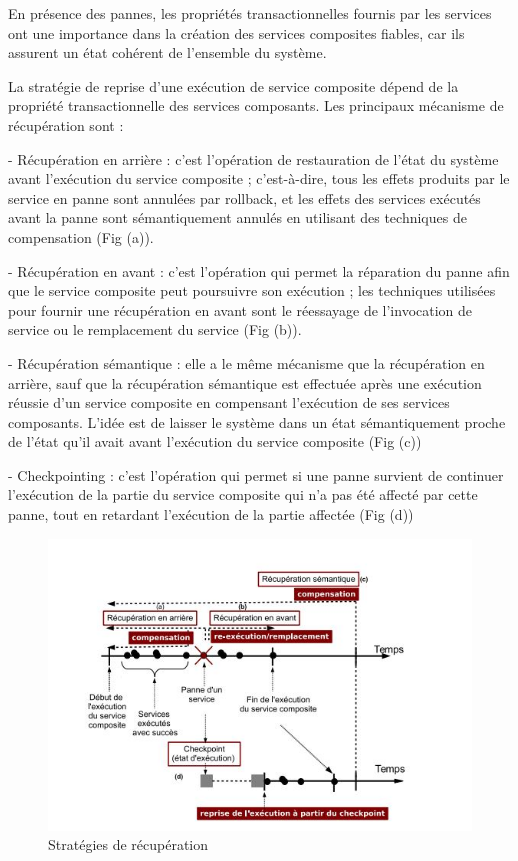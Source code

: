 En présence des pannes, les propriétés transactionnelles fournis par les services ont une importance dans la création des services composites fiables, car ils assurent un état cohérent de l'ensemble du système.

La stratégie de reprise d'une exécution de service composite dépend de la propriété transactionnelle des services composants.
Les principaux mécanisme de récupération sont \cite{1} : 

- Récupération en arrière : c'est l'opération de restauration de l’état du système avant l’exécution du service composite ; c’est-à-dire, tous les effets produits par le service en panne sont annulées par rollback, et les effets des services exécutés avant la panne sont sémantiquement annulés en utilisant des techniques de compensation (Fig (a)).


- Récupération en avant : c'est l'opération qui permet la réparation du panne afin que le  service composite peut poursuivre son exécution ; les techniques utilisées pour fournir une récupération en avant sont le réessayage de l’invocation de service ou le remplacement du service (Fig (b)).


- Récupération sémantique : elle a le même mécanisme que la récupération en arrière, sauf que la récupération sémantique est effectuée après une exécution réussie d’un service composite en compensant l’exécution de ses services composants. L’idée est de laisser le système dans un état sémantiquement proche de l’état qu’il avait avant l’exécution du service composite (Fig (c))

- Checkpointing : c'est l'opération qui permet si une panne survient de continuer l’exécution de la partie du service composite qui n’a pas été affecté par cette panne, tout en retardant l’exécution de la partie affectée (Fig (d))

\begin{figure}[H]
\begin{center}
\includegraphics[width=1\linewidth]{images/techs reparation.jpg}
\end{center}
\caption{Stratégies de récupération \cite{1}}
\label{fig:3}
\end{figure}